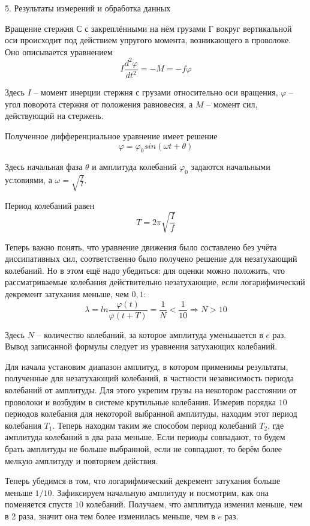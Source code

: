 \documentclass[12pt, a4paper]{article}
\begin{document}
\vspace*{0.3cm}
{\Large 5. Результаты измерений и обработка данных \\} 

Вращение стержня С с закреплёнными на нём грузами Г вокруг вертикальной оси происходит под действием упругого момента, возникающего в проволоке. Оно описывается уравнением
\[I \frac{d^2 \varphi}{d t^2} = -M = -f \varphi\]

Здесь $I$ -- момент инерции стержня с грузами относительно оси вращения, $\varphi$ -- угол поворота стержня от положения равновесия, а $M$ -- момент сил, действующий на стержень. 

Полученное дифференциальное уравнение имеет решение
\[\varphi = \varphi_0 sin(\omega t + \theta)\]

Здесь начальная фаза $\theta$ и амплитуда колебаний $\varphi_0$ задаются начальными условиями, а $\omega = \sqrt{\frac{f}{I}}$.

Период колебаний равен 
\[T = 2 \pi \sqrt{\frac{I}{f}} \]

Теперь важно понять, что уравнение движения было составлено без учёта диссипативных сил, соответственно было получено решение для незатухающий колебаний. Но в этом ещё надо убедиться: для оценки можно положить, что рассматриваемые колебания действительно незатухающие, если логарифмический декремент затухания меньше, чем $0,1$:
\[\lambda = ln\frac{\varphi (t)}{\varphi (t + T)} = \frac{1}{N} < \frac{1}{10} \Rightarrow N > 10\]

Здесь $N$ -- количество колебаний, за которое амплитуда уменьшается в $e$ раз. Вывод записанной формулы следует из уравнения затухающих колебаний.

Для начала установим диапазон амплитуд, в котором применимы результаты, полученные для незатухающий колебаний, в частности независимость периода колебаний от амплитуды. Для этого укрепим грузы на некотором расстоянии от проволоки и возбудим в системе крутильные колебания. Измерив порядка $10$ периодов колебания для некоторой выбранной амплитуды, находим этот период колебания $T_1$. Теперь находим таким же способом период колебаний $T_2$, где амплитуда колебаний в два раза меньше. Если периоды совпадают, то будем брать амплитуды не больше выбранной, если не совпадают, то берём более мелкую амплитуду и повторяем действия.  

Теперь убедимся в том, что логарифмический декремент затухания больше меньше $1/10$. Зафиксируем начальную амплитуду и посмотрим, как она поменяется спустя $10$ колебаний. Получаем, что амплитуда изменил меньше, чем в 2 раза, значит она тем более изменилась меньше, чем в $e$ раз.
\end{document}
